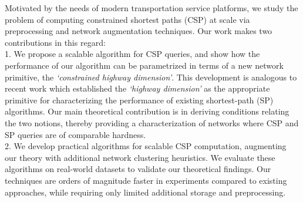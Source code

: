 Motivated by the needs of modern transportation service platforms, we study the problem of computing constrained shortest paths (CSP) at scale via preprocessing and network augmentation techniques.
Our work makes two contributions in this regard:\\
1. We propose a scalable algorithm for CSP queries, and show how the performance of our algorithm can be parametrized in terms of a new network primitive, the \emph{`constrained highway dimension'}. 
This development is analogous to recent work which established the \emph{`highway dimension'} as the appropriate primitive for characterizing the performance of existing shortest-path (SP) algorithms. 
Our main theoretical contribution is in deriving conditions relating the two notions, thereby providing a characterization of networks where CSP and SP queries are of comparable hardness.\\
2. We develop practical algorithms for scalable CSP computation, augmenting our theory with additional network clustering heuristics. We evaluate these algorithms on real-world datasets to validate our theoretical findings. Our techniques are orders of magnitude faster in experiments compared to existing approaches, while requiring only limited additional storage and preprocessing.